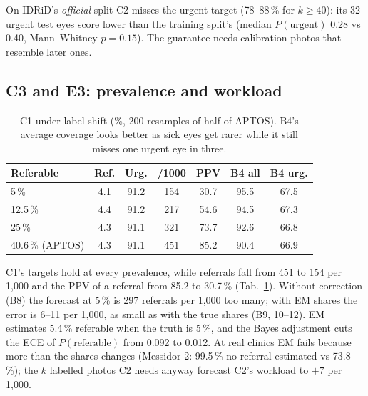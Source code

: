 \documentclass[10pt,twocolumn,letterpaper]{article}
\newcommand{\pct}{\,\%}
\begin{document}
On IDRiD's \emph{official} split C2 misses the urgent target (78--88\pct{} for $k\ge40$): its 32 urgent test eyes score lower than the training split's (median $P(\text{urgent})$ 0.28 vs 0.40, Mann--Whitney $p=0.15$). The guarantee needs calibration photos that resemble later ones.

\subsection{C3 and E3: prevalence and workload}
\begin{table}[t]\centering\small
\begin{tabular}{@{}lcccccc@{}}\toprule
Referable & Ref. & Urg. & /1000 & PPV & B4 all & B4 urg.\\\midrule
5\pct & 4.1 & 91.2 & 154 & 30.7 & 95.5 & 67.5\\
12.5\pct & 4.4 & 91.2 & 217 & 54.6 & 94.5 & 67.3\\
25\pct & 4.3 & 91.1 & 321 & 73.7 & 92.6 & 66.8\\
40.6\pct{} (APTOS) & 4.3 & 91.1 & 451 & 85.2 & 90.4 & 66.9\\\bottomrule
\end{tabular}
\caption{C1 under label shift (\%, 200 resamples of half of APTOS). B4's average coverage looks better as sick eyes get rarer while it still misses one urgent eye in three.}\label{tab:c3}
\end{table}
C1's targets hold at every prevalence, while referrals fall from 451 to 154 per 1,000 and the PPV of a referral from 85.2 to 30.7\pct{} (Tab.~\ref{tab:c3}). Without correction (B8) the forecast at 5\pct{} is 297 referrals per 1,000 too many; with EM shares the error is 6--11 per 1,000, as small as with the true shares (B9, 10--12). EM estimates 5.4\pct{} referable when the truth is 5\pct, and the Bayes adjustment cuts the ECE of $P(\text{referable})$ from 0.092 to 0.012. At real clinics EM fails because more than the shares changes (Messidor-2: 99.5\pct{} no-referral estimated vs 73.8\pct); the $k$ labelled photos C2 needs anyway forecast C2's workload to $+7$ per 1,000.
\end{document}

